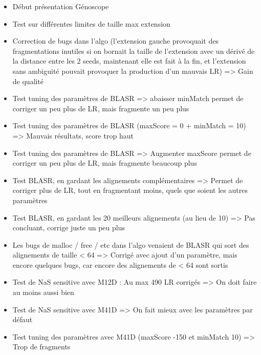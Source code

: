 \documentclass[12pt]{report}
\begin{document}
\begin{itemize}	 
	 \item Début présentation Génoscope
	 
	 \item Test sur différentes limites de taille max extension 
	 
	 \item Correction de bugs dans l'algo (l'extension gauche provoquait des fragmentations inutiles si on bornait la taille de l'extension
	 	   avec un dérivé de la distance entre les 2 seeds, maintenant elle est fait à la fin,
	 	   et l'extension sans ambiguité pouvait provoquer la production d'un mauvais LR) => Gain de qualité
	 	   
	  \item Test tuning des paramètres de BLASR => abaisser minMatch permet de corriger un peu plus de LR,
	  		mais fragmente un peu plus
	 	   
	 \item Test tuning des paramètres de BLASR (maxScore = 0 + minMatch = 10) => Mauvais résultats, score trop haut
	 
	 \item Test tuning des paramètres de BLASR => Augmenter maxScore permet de corriger un peu plus de LR,
	 	   mais fragmente beaucoup plus
	 	   
	 \item Test BLASR, en gardant les alignements complémentaires => Permet de corriger plus de LR, tout en fragmentant moins,
	 	   quels que soient les autres paramètres
	 	   
	 \item Test BLASR, en gardant les 20 meilleurs alignements (au lieu de 10) => Pas concluant, corrige juste un peu plus
	 
	 \item Les bugs de malloc / free / etc dans l'algo venaient de BLASR qui sort des alignements de taille < 64 => Corrigé avec ajout d'un paramètre,
	 	   mais encore quelques bugs, car encore des alignements de < 64 sont sortis
	 
	 \item Test de NaS sensitive avec M12D : Au max 490 LR corrigés => On doit faire au moins aussi bien
	 
	 \item Test de NaS sensitive avec M41D => On fait mieux avec les paramètres par défaut
	 
	 \item Test tuning des paramètres avec M41D (maxScore -150 et minMatch 10) => Trop de fragments
\end{itemize}
\end{document}
